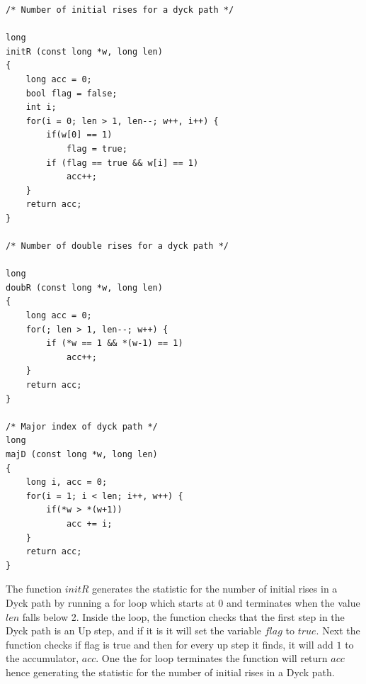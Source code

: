 \documentclass[12pt]{article}
\begin{document}
\begin{lstlisting}
/* Number of initial rises for a dyck path */

long
initR (const long *w, long len)
{
	long acc = 0;
	bool flag = false;
	int i;	
	for(i = 0; len > 1, len--; w++, i++) {
		if(w[0] == 1)
			flag = true;		
		if (flag == true && w[i] == 1)
			acc++;
	}
	return acc;
}

/* Number of double rises for a dyck path */

long
doubR (const long *w, long len)
{
	long acc = 0;
	for(; len > 1, len--; w++) {
		if (*w == 1 && *(w-1) == 1)
			acc++;
	}
	return acc;
}

/* Major index of dyck path */
long
majD (const long *w, long len)
{
	long i, acc = 0;
	for(i = 1; i < len; i++, w++) {
		if(*w > *(w+1))
			acc += i;
	}
	return acc;
}
\end{lstlisting}
The function $initR$ generates the statistic for the number of initial rises in a Dyck path by running a for loop which starts at $0$ and terminates when the value $len$ falls below 2. Inside the loop, the function checks that the first step in the Dyck path is an Up step, and if it is it will set the variable $flag$ to $true$. Next the function checks if flag is true and then for every up step it finds, it will add $1$ to the accumulator, $acc$. One the for loop terminates the function will return $acc$ hence generating the statistic for the number of initial rises in a Dyck path.\\
\end{document}
